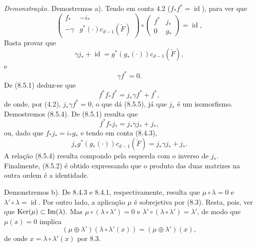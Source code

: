 \emph{Demonstração.} Demostremos a). Tendo em conta 4.2 ($f_*f^*=\operatorname{id}$), para ver que
\[
\begin{pmatrix}
f_*&-i_*\\
-\gamma&g^*(\cdot)c_{d-1}(\check F)
\end{pmatrix}
\circ
\begin{pmatrix}
f^*&j_*\\
0&g_*
\end{pmatrix}
=\operatorname{id},
\]
Basta provar que
\[
\gamma j_*+\operatorname{id}=g^*(g_*(\cdot))c_{d-1}(\check F),
\tag{8.5.4}
\]
e
\[
\gamma f^*=0.
\tag{8.5.5}
\]
De (8.5.1) deduz-se que
\[
f^*f_*f^*=j_*\gamma f^*+f^*,
\]
de onde, por (4.2), $j_*\gamma f^*=0$, o que dá (8.5.5), já que $j_*$ é um isomorfismo. Demostremos (8.5.4). De (8.5.1) resulta que
\[
f^*f_*j_*=j_*\gamma j_*+j_*,
\]
ou, dado que $f_*j_*=i_*g_*$ e tendo em conta (8.4.3),
\[
j_*g^*(g_*(\cdot))c_{d-1}(\check F)=j_*\gamma j_*+j_*.
\]
A relação (8.5.4) resulta compondo pela esquerda com o inverso de $j_*$. Finalmente, (8.5.2) é obtido expressando que o produto das duas matrizes na outra ordem é a identidade.

Demonstremos b). De 8.4.3 e 8.4.1, respectivamente, resulta que $\mu\circ\lambda=0$ e $\lambda'\circ\lambda=\operatorname{id}$. Por outro lado, a aplicação $\mu$ é sobrejetiva por (8.3). Resta, pois, ver que $\operatorname{Ker}(\mu)\subset\operatorname{Im}(\lambda)$. Mas $\mu\circ(\lambda\circ\lambda')=0$ e $\lambda'\circ(\lambda\circ\lambda')=\lambda'$, de modo que $\mu(x)=0$ implica
\[
(\mu\oplus\lambda')(\lambda\circ\lambda'(x))=(\mu\oplus\lambda')(x),
\]
de onde $x=\lambda\circ\lambda'(x)$ por 8.3.
